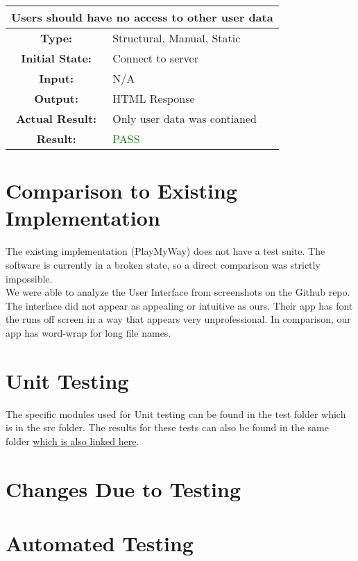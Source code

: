 \documentclass[12pt, titlepage]{article}
\begin{document}
\begin{center}
\begin{table}[H]
\begin{tabularx}{\textwidth}{| c X |}
\hline
\multicolumn{2}{|c|}{\textbf{Users should have no access to other user data}}\\
\hline
\textbf{Type: } & Structural, Manual, Static\\
\textbf{Initial State: } & Connect to server\\
\textbf{Input: } & N/A\\
\textbf{Output: } & HTML Response \\
\textbf{Actual Result:  } & Only user data was contianed \\
\textbf{Result: } & \textcolor{green}{PASS}\\
\hline
\end{tabularx}
\end{table}
\end{center}

\section{Comparison to Existing Implementation}	
The existing implementation (PlayMyWay) does not have a test suite. The software is currently in a broken state, so a direct comparison was strictly impossible.\\

We were able to analyze the User Interface from screenshots on the Github repo. The interface did not appear as appealing or intuitive as ours. Their app has font the runs off screen in a way that appears very unprofessional. In comparison, our app has word-wrap for long file names.\\

\section{Unit Testing}
The specific modules used for Unit testing can be found in the test folder which is in the src folder. The results for these tests can also be found in the same folder \href{run:../../src/test/Test-Report-001-12-1-2016.PNG}{which is also linked here}.

\section{Changes Due to Testing}

\section{Automated Testing}
\end{document}
